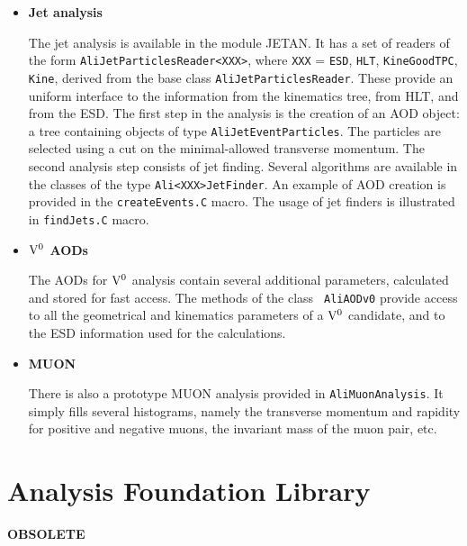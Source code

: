 \documentclass[12pt,a4paper,twoside]{article}
\begin{document}
{\begin{itemize}
\begin{itemize}
  \item[ ] \textbf{Jet analysis}

    The jet analysis\cite{CH6Ref:Loizides} is available in the module JETAN. It has a set of
    readers of the form \texttt{AliJetParticlesReader<XXX>}, where \texttt{XXX}
    = \texttt{ESD},
    \texttt{HLT}, \texttt{KineGoodTPC}, \texttt{Kine}, derived from the base class
    \texttt{AliJetParticlesReader}. These
    provide an uniform interface to
    the information from the 
    kinematics tree, from HLT, and from the ESD. The first step in the
    analysis is the creation of an AOD object: a tree containing objects of
    type \texttt{AliJetEventParticles}. The particles are selected using a
    cut on the minimal-allowed transverse momentum. The second analysis
    step consists of jet finding. Several algorithms are available in the
    classes of the type \texttt{Ali<XXX>JetFinder}.
    An example of AOD creation is provided in
    the \texttt{createEvents.C} macro. The usage of jet finders is illustrated in
    \texttt{findJets.C} macro.


  \item[ ] \textbf{${\rm V^0}$ AODs}

    The AODs for ${\rm V^0}$ analysis contain several additional parameters,
    calculated and stored for fast access. The methods of the class {\tt
      AliAODv0} provide access to all the geometrical and kinematics
    parameters of a ${\rm V^0}$ candidate, and to the ESD information used
    for the calculations.

    \vspace{-0.1cm}
  \item[ ] \textbf{MUON}

    There is also a prototype MUON analysis provided in
    \texttt{AliMuonAnalysis}. It simply fills several histograms, namely
    the transverse momentum and rapidity for positive and negative muons,
    the invariant mass of the muon pair, etc.
  \end{itemize}

\end{itemize}


\newpage
\section{Analysis Foundation Library}

{\bf OBSOLETE}

}
\end{document}
